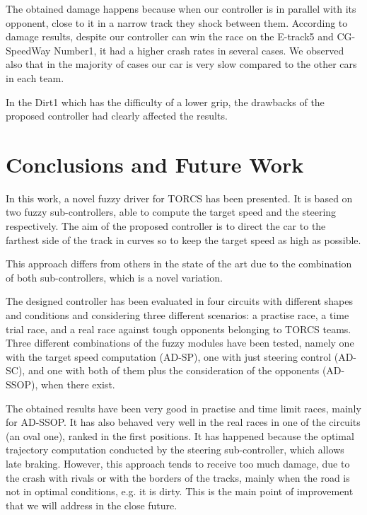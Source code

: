 \documentclass[runningheads,a4paper]{llncs}
\begin{document}
	The obtained damage happens because when our controller is in parallel with its opponent, close to it in a narrow track they shock between them.
	According to damage results, despite our controller can win the race on the E-track5 and CG-SpeedWay Number1, it had a higher crash rates in several cases. We observed also that in the majority of cases our car is very slow compared to the other cars in each team. 
	
	In the Dirt1 which has the difficulty of a lower grip, the drawbacks of the proposed controller had clearly affected the results.
	
	
	\section{Conclusions and Future Work} 
	\label{sec:conclusions}
	
	In this work, a novel fuzzy driver for TORCS has been presented. It is based on two fuzzy sub-controllers, able to compute the target speed and the steering respectively. The aim of the proposed controller is to direct the car to the farthest side of the track in curves so to keep the target speed as high as possible. 
	
	This approach differs from others in the state of the art due to the combination of both sub-controllers, which is a novel variation.
	
	The designed controller has been evaluated in four circuits with different shapes and conditions and considering three different scenarios: a practise race, a time trial race, and a real race against tough opponents belonging to TORCS teams. Three different combinations of the fuzzy modules have been tested, namely one with the target speed computation (AD-SP), one with just steering control (AD-SC), and one with both of them plus the consideration of the opponents (AD-SSOP), when there exist.
	
	The obtained results have been very good in practise and time limit races, mainly for AD-SSOP. It has also behaved very well in the real races in one of the circuits (an oval one), ranked in the first positions. It has happened because the optimal trajectory computation conducted by the steering sub-controller, which allows late braking. However, this approach tends to receive too much damage, due to the crash with rivals or with the borders of the tracks, mainly when the road is not in optimal conditions, e.g. it is dirty.
	This is the main point of improvement that we will address in the close future.
	
\end{document}
